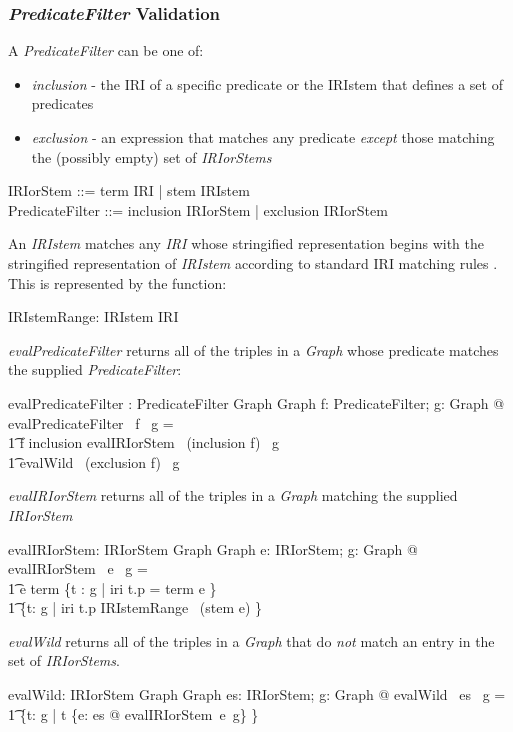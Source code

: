 \documentclass[fuzz]{llncs}
\def\entryFor{\cdot}
\def\zc{\textit}
\begin{document}
\subsubsection{\zc{PredicateFilter} Validation}
A \zc{PredicateFilter} can be one of:
\begin{itemize}
\item \zc{inclusion} - the IRI of a specific predicate or the IRIstem that defines a set of
predicates
\item \zc{exclusion} - an expression that matches any predicate \emph{except} those matching the (possibly empty) set of \zc{IRIorStems} 
\end{itemize}
\begin{zed}
IRIorStem ::= term \ldata IRI \rdata | stem \ldata IRIstem \rdata \\
PredicateFilter ::= inclusion \ldata IRIorStem \rdata | exclusion \ldata \power IRIorStem \rdata
\end{zed}
An \zc{IRIstem} matches any \zc{IRI} whose stringified representation begins with the stringified
representation of \zc{IRIstem} according to standard IRI matching rules \cite{RFC3987}. This is represented by the function:
\begin{zed}
[IRIstem]
\end{zed}
\begin{gendef}
	IRIstemRange: IRIstem \pfun \power IRI
\end{gendef}
\zc{evalPredicateFilter} returns all of the triples in a \zc{Graph} whose predicate
matches the supplied \zc{PredicateFilter}:
\begin{gendef}
   evalPredicateFilter : PredicateFilter \pfun Graph \pfun Graph
\where
   \forall f: PredicateFilter; g: Graph @ evalPredicateFilter~ f ~g = \\
\t1 \IF f \in \ran inclusion \THEN evalIRIorStem~ (inclusion \entryFor f)~ g \\
\t1 \ELSE evalWild~ (exclusion \entryFor f)~ g
\end{gendef}
\zc{evalIRIorStem} returns all of the triples in a \zc{Graph} matching the supplied 
\zc{IRIorStem}
\begin{gendef}
   evalIRIorStem: IRIorStem \pfun Graph \pfun Graph
\where
   \forall e: IRIorStem; g: Graph @ evalIRIorStem~ e ~g = \\
\t1 \IF e \in \ran term \THEN \{t : g | iri \entryFor t.p = term \entryFor e \} \\
\t1 \ELSE \{t: g | iri \entryFor t.p \in IRIstemRange~ (stem \entryFor e) \}
\end{gendef}
\zc{evalWild} returns all of the triples in a \zc{Graph} that do \emph{not} match an entry
in the set of \zc{IRIorStems}.
\begin{gendef}
   evalWild: \power IRIorStem \pfun Graph \pfun Graph
\where
   \forall es: \power IRIorStem; g: Graph @ evalWild ~es ~g = \\
\t1 \{t: g | t \notin \bigcup \{e: es @ evalIRIorStem~e~g\} \}
\end{gendef}
\end{document}
